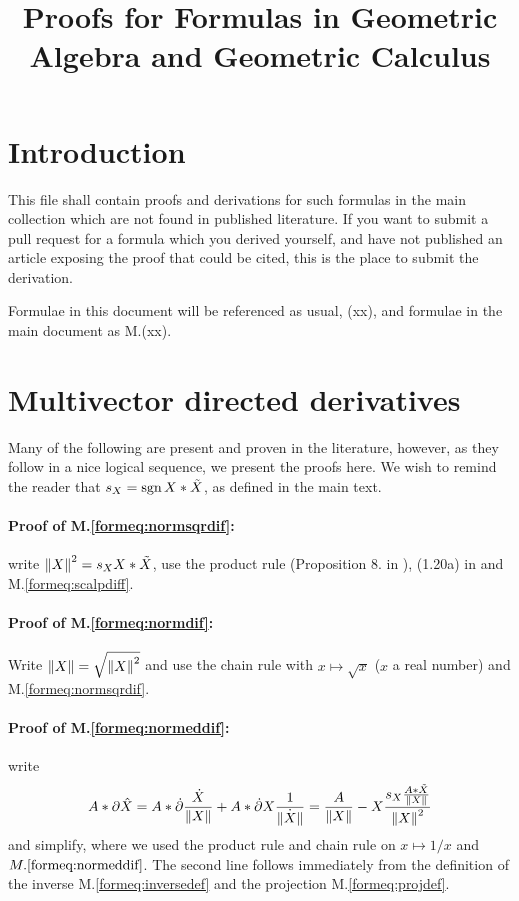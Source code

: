 \documentclass[a4paper,12pt]{article}
\title{Proofs for Formulas in Geometric Algebra and Geometric Calculus}
\author{}
\newcommand{\meqref}[1]{M.\eqref{form#1}}
\theoremstyle{definition}
\begin{document}
\maketitle

\section{Introduction}

This file shall contain proofs and derivations for such formulas in the main collection which are not found in published literature. If you want to submit a pull request for a formula which you derived yourself, and have not published an article exposing the proof that could be cited, this is the place to submit the derivation.

Formulae in this document will be referenced as usual, (xx), and formulae in the main document as M.(xx).
\section{Multivector directed derivatives}

Many of the following are present and proven in the literature, however, as they follow in a nice logical sequence, we present the proofs here.
We wish to remind the reader that $s_{X} = \operatorname{sgn}{X * \tilde{X}}$, as defined in the main text.

\paragraph{Proof of \meqref{eq:normsqrdif}:} write $\left\lVert X\right\rVert^2 = s_{X} X * \tilde{X}$, use the product rule (Proposition 8. in \cite{HitzerCalculus}), (1.20a) in \cite{CA2GC} and \meqref{eq:scalpdiff}.

\paragraph{Proof of \meqref{eq:normdif}:} Write $\left\lVert X\right\rVert = \sqrt{\left\lVert X\right\rVert^2}$ and use the chain rule with $x \mapsto \sqrt{x}$ ($x$ a real number) and \meqref{eq:normsqrdif}.

\paragraph{Proof of \meqref{eq:normeddif}:} write
\begin{equation}
A*\partial \hat{X} = A*\dot{\partial} \frac{\dot{X}}{\left\lVert X\right\rVert} + A*\dot{\partial} X \frac{1}{\dot{\left\lVert X\right\rVert}} = \frac{A}{\left\lVert X\right\rVert} - X \frac{s_{X} \frac{A * \tilde{X}}{\left\lVert X\right\rVert}}{\left\lVert X\right\rVert^2}
\end{equation}
and simplify, where we used the product rule and chain rule on $x \mapsto 1/x$ and $\meqref{eq:normeddif}$.
The second line follows immediately from the definition of the inverse \meqref{eq:inversedef} and the projection \meqref{eq:projdef}.
\end{document}
